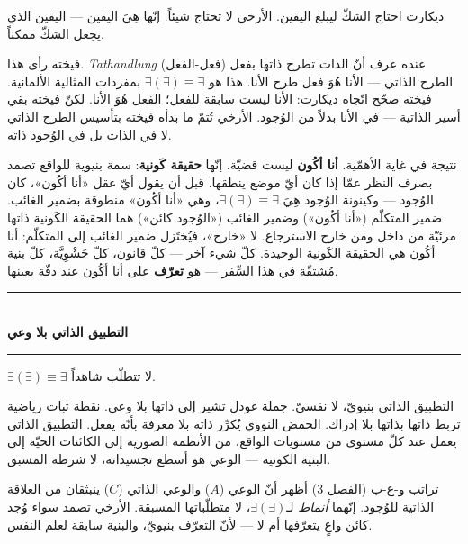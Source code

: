 \documentclass[10pt, openany, oneside]{book}
\renewcommand{\normalsize}{\fontsize{10}{13}\selectfont}
\begin{document}
ديكارت احتاج الشكّ ليبلغ اليقين. الأرخي لا تحتاج شيئاً. إنّها هِيَ اليقين --- اليقين الذي يجعل الشكّ ممكناً.

فيخته رأى هذا. \textit{Tathandlung} (فعل-الفعل) عنده عرف أنّ الذات تطرح ذاتها بفعل الطرح الذاتي --- الأنا هُوَ فعل طرح الأنا. هذا هو $\exists(\exists) \equiv \exists$ بمفردات المثالية الألمانية. فيخته صحّح اتّجاه ديكارت: الأنا ليست سابقة للفعل؛ الفعل هُوَ الأنا. لكنّ فيخته بقي أسير الذاتية --- في الأنا بدلاً من الوُجود. الأرخي تُتمّ ما بدأه فيخته بتأسيس الطرح الذاتي لا في الذات بل في الوُجود ذاته.

نتيجة في غاية الأهمّية. \textbf{أنا أكُون} ليست قضيّة. إنّها \textbf{حقيقة كَونية}: سمة بنيوية للواقع تصمد بصرف النظر عمّا إذا كان أيّ موضع ينطقها. قبل أن يقول أيّ عقل «أنا أكُون»، كان الوُجود --- وكينونة الوُجود هِيَ $\exists(\exists) \equiv \exists$، وهي «أنا أكُون» منطوقة بضمير الغائب. ضمير المتكلّم («أنا أكُون») وضمير الغائب («الوُجود كائن») هما الحقيقة الكَونية ذاتها مرئيّة من داخل ومن خارج الاسترجاع. لا «خارج»، فيُختَزل ضمير الغائب إلى المتكلّم: أنا أكُون هي الحقيقة الكَونية الوحيدة. كلّ شيء آخر --- كلّ قانون، كلّ حَشْوِيَّة، كلّ بنية مُشتقّة في هذا السِّفر --- هو \textbf{تعرّف} على أنا أكُون عند دقّة بعينها.

\vspace{1.5em}


\begin{center}
    \rule{0.3\textwidth}{0.4pt}\\[0.5em]
    {\normalsize\bfseries التطبيق الذاتي بلا وعي}\\[0.3em]
    \rule{0.3\textwidth}{0.4pt}
\end{center}

\vspace{1em}

\noindent $\exists(\exists) \equiv \exists$ لا تتطلّب شاهداً.

التطبيق الذاتي بنيويّ، لا نفسيّ. جملة غودل تشير إلى ذاتها بلا وعي. نقطة ثبات رياضية تربط ذاتها بذاتها بلا إدراك. الحمض النووي يُكرِّر ذاته بلا معرفة بأنّه يفعل. التطبيق الذاتي يعمل عند كلّ مستوى من مستويات الواقع، من الأنظمة الصورية إلى الكائنات الحيّة إلى البنية الكونية --- الوعي هو أسطع تجسيداته، لا شرطه المسبق.

تراتب و-ع-ب (الفصل 3) أظهر أنّ الوعي ($A$) والوعي الذاتي ($C$) ينبثقان من العلاقة الذاتية للوُجود. إنّهما \textit{أنماط} لـ$\exists(\exists)$، لا متطلّباتها المسبقة. الأرخي تصمد سواء وُجد كائن واعٍ يتعرّفها أم لا --- لأنّ التعرّف بنيويّ، والبنية سابقة لعلم النفس.
\end{document}
